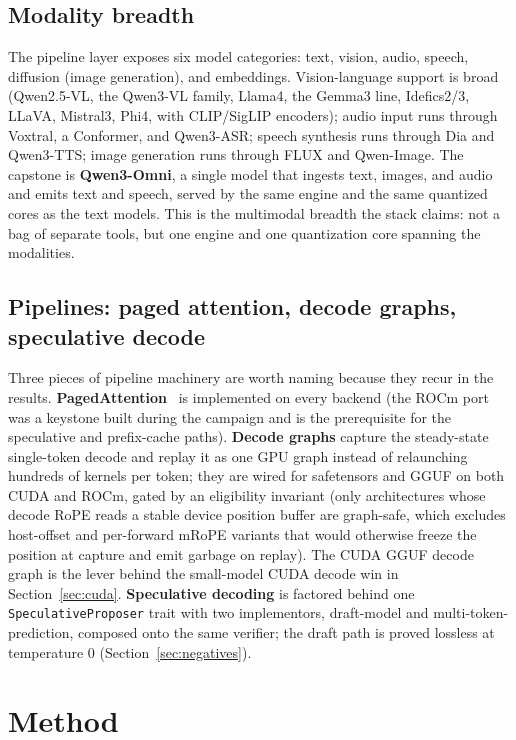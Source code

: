 \documentclass[11pt]{article}
\begin{document}
\subsection{Modality breadth}
\label{sec:modality}

The pipeline layer exposes six model categories: text, vision, audio, speech, diffusion (image
generation), and embeddings. Vision-language support is broad (Qwen2.5-VL, the Qwen3-VL family,
Llama4, the Gemma3 line, Idefics2/3, LLaVA, Mistral3, Phi4, with CLIP/SigLIP encoders); audio input
runs through Voxtral, a Conformer, and Qwen3-ASR; speech synthesis runs through Dia and Qwen3-TTS;
image generation runs through FLUX and Qwen-Image. The capstone is \textbf{Qwen3-Omni}, a single
model that ingests text, images, and audio and emits text and speech, served by the same engine and
the same quantized cores as the text models. This is the multimodal breadth the stack claims: not a
bag of separate tools, but one engine and one quantization core spanning the modalities.

\subsection{Pipelines: paged attention, decode graphs, speculative decode}
\label{sec:pipelines}

Three pieces of pipeline machinery are worth naming because they recur in the results.
\textbf{PagedAttention}~\cite{kwon2023} is implemented on every backend (the ROCm port was a
keystone built during the campaign and is the prerequisite for the speculative and prefix-cache
paths). \textbf{Decode graphs} capture the steady-state single-token decode and replay it as one GPU
graph instead of relaunching hundreds of kernels per token; they are wired for safetensors and GGUF
on both CUDA and ROCm, gated by an eligibility invariant (only architectures whose decode RoPE reads
a stable device position buffer are graph-safe, which excludes host-offset and per-forward mRoPE
variants that would otherwise freeze the position at capture and emit garbage on replay). The CUDA
GGUF decode graph is the lever behind the small-model CUDA decode win in Section~\ref{sec:cuda}.
\textbf{Speculative decoding} is factored behind one \texttt{SpeculativeProposer} trait with two
implementors, draft-model and multi-token-prediction, composed onto the same verifier; the draft path
is proved lossless at temperature $0$ (Section~\ref{sec:negatives}).

\section{Method}
\label{sec:method}
\end{document}
